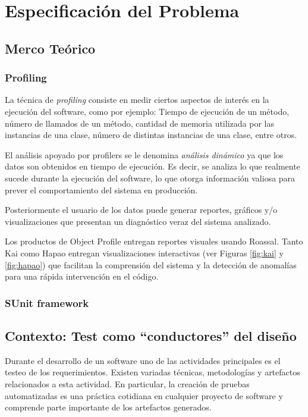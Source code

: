 \chapter{Especificación del Problema}



\section{Merco Teórico}


\subsection{Profiling}
\par La técnica de \emph{profiling} consiste en medir ciertos aspectos de interés en la ejecución del software, como por ejemplo: Tiempo de ejecución de un método, número de llamados de un método, cantidad de memoria utilizada por las instancias de una clase, número de distintas instancias de una clase, entre otros. 
\par El análisis apoyado por profilers se le denomina \emph{análisis dinámico} ya que los datos son obtenidos en tiempo de ejecución. Es decir, se analiza lo que realmente sucede durante la ejecución del software, lo que otorga información valiosa para prever el comportamiento del sistema en producción.
\par Posteriormente el usuario de los datos puede generar reportes, gráficos y/o visualizaciones que presentan un diagnóstico veraz del sistema analizado. 
\par Los productos de Object Profile  entregan reportes visuales usando Roassal. Tanto Kai como Hapao entregan visualizaciones interactivas (ver Figuras \ref{fig:kai} y \ref{fig:hapao}) que facilitan la comprensión del sistema y la detección de anomalías para una rápida intervención en el código.

\subsection{SUnit framework}

\section{Contexto: Test como ``conductores'' del diseño}
\par Durante el desarrollo de un software uno de las actividades principales es el testeo de los requerimientos. Existen variadas técnicas, metodologías y artefactos relacionados a esta actividad. En particular, la creación de pruebas automatizadas es una práctica cotidiana en cualquier proyecto de software y comprende parte importante de los artefactos generados. \\

